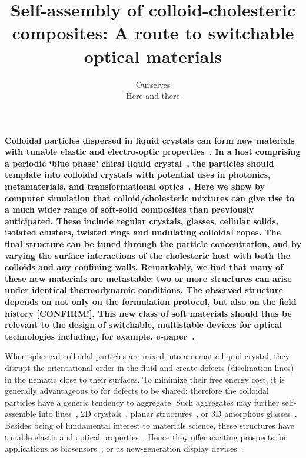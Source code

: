 \documentclass[12pt]{article}
\begin{document}
\title{Self-assembly of colloid-cholesteric composites: A route to switchable optical materials}
\author{Ourselves \\ {\small Here and there}}
\date{}

\maketitle

{\bf Colloidal particles dispersed in liquid crystals can form new materials with tunable elastic and electro-optic properties~\cite{stark}. In a host comprising  a periodic `blue phase' chiral liquid crystal~\cite{mermin}, the particles should template into colloidal crystals \cite{miha} with potential uses in photonics, metamaterials, and transformational optics~\cite{lavrentovich}. 
Here we show by computer simulation that colloid/cholesteric mixtures can give rise to a much wider range of soft-solid composites than previously anticipated. These include regular crystals, glasses, cellular solids, isolated clusters, twisted rings and undulating colloidal ropes. The final structure can be tuned through the particle concentration, and by varying the surface interactions of the cholesteric host with both the colloids and any confining walls. 
Remarkably, we find that many of these new materials are metastable: two or more structures can arise under identical thermodynamic conditions. The observed structure depends on not only on the formulation protocol, but also on the field history [CONFIRM!].  
This new class of soft materials should thus be relevant to the design of switchable, multistable devices for optical technologies including, for example, e-paper~\cite{epaper}.}

When spherical colloidal particles are mixed into a nematic liquid crystal, 
they disrupt the orientational order in the fluid and create defects (disclination lines) in the nematic close to their surfaces. To minimize their free energy cost, it is generally advantageous to for defects to be shared:
therefore the colloidal particles have a generic tendency to aggregate. Such aggregates may further 
self-assemble into lines~\cite{wiresmiha}, 2D crystals~\cite{zumer}, 
planar structures~\cite{tanaka}, or 3D amorphous glasses~\cite{tiffany}.
Besides being of fundamental interest to materials science, these
structures have tunable elastic and optical properties~\cite{stark}. Hence 
they offer exciting prospects for applications as biosensors~\cite{abbott}, or
as new-generation display devices~\cite{colloiddevice}.
\end{document}
